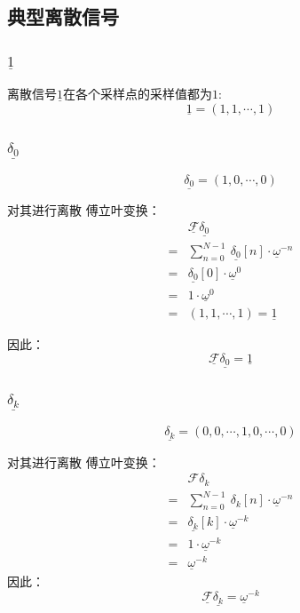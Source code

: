 \subsection{典型离散信号}
\subsubsection{$\underline{1}$}
离散信号$\underline{1}$在各个采样点的采样值都为$1$:
$$\underline{1}=(1,1,\cdots,1)$$
\subsubsection{$\underline{\delta_0}$}
$$\underline{\delta_0}=(1,0,\cdots,0)$$

对其进行离散 傅立叶变换：
\begin{align*}
	  & \underline{\mathcal{F}}\underline{\delta_0}                                   \\
	= & \sum\limits_{n=0}^{N-1}\ \underline{\delta_0}[n]\cdot \underline{\omega}^{-n} \\
	= & \underline{\delta_0}[0]\cdot \underline{\omega}^0                             \\
	= & 1\cdot \underline{\omega}^0                                                   \\
	= & (1,1,\cdots,1)=\underline{1}
\end{align*}

因此：
\begin{equation}
	\underline{\mathcal{F}}\underline{\delta_0}=\underline{1}
\end{equation}

\subsubsection{$\underline{\delta_k}$}
$$\underline{\delta_k}=(0,0,\cdots,1,0,\cdots,0)$$

对其进行离散 傅立叶变换：
\begin{align*}
	  & \mathcal{F}\delta_k                                               \\
	= & \sum\limits_{n=0}^{N-1}\ \delta_k[n]\cdot \underline{\omega}^{-n} \\
	= & \underline{\delta_k}[k]\cdot \underline{\omega}^{-k}              \\
	= & 1\cdot \underline{\omega}^{-k}                                    \\
	= & \underline{\omega}^{-k}
\end{align*}
因此：
\begin{equation}
	\underline{\mathcal{F}}\underline{\delta_k}=\underline{\omega}^{-k}
\end{equation}
